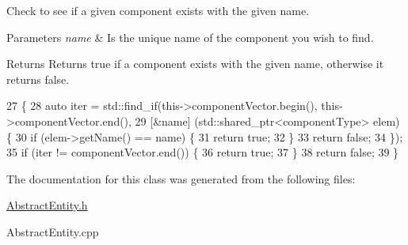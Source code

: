 Check to see if a given component exists with the given name. 


\begin{DoxyParams}{Parameters}
{\em name} & Is the unique name of the component you wish to find.\\
\hline
\end{DoxyParams}
\begin{DoxyReturn}{Returns}
Returns true if a component exists with the given name, otherwise it returns false. 
\end{DoxyReturn}

\begin{DoxyCode}
27                                                            \{
28     \textcolor{keyword}{auto} iter = std::find\_if(this->componentVector.begin(), this->componentVector.end(),
29         [&name] (std::shared\_ptr<componentType> elem) \{
30             \textcolor{keywordflow}{if} (elem->getName() == name) \{
31                 \textcolor{keywordflow}{return} \textcolor{keyword}{true};
32             \}
33             \textcolor{keywordflow}{return} \textcolor{keyword}{false};
34     \});
35     \textcolor{keywordflow}{if} (iter != componentVector.end()) \{
36         \textcolor{keywordflow}{return} \textcolor{keyword}{true};
37     \}
38     \textcolor{keywordflow}{return} \textcolor{keyword}{false};
39 \}
\end{DoxyCode}


The documentation for this class was generated from the following files\-:\begin{DoxyCompactItemize}
\item 
\hyperlink{_abstract_entity_8h}{Abstract\-Entity.\-h}\item 
Abstract\-Entity.\-cpp\end{DoxyCompactItemize}
